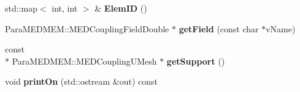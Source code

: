 \begin{DoxyCompactItemize}
\item 
\hypertarget{class_lib_mesh_function_a455f565d4bcedad79a3ece4bc38cb213}{std\-::map$<$ int, int $>$ \& {\bfseries Elem\-I\-D} ()}\label{class_lib_mesh_function_a455f565d4bcedad79a3ece4bc38cb213}

\item 
\hypertarget{class_lib_mesh_function_a89398c781ae98e1130281232cae85585}{Para\-M\-E\-D\-M\-E\-M\-::\-M\-E\-D\-Coupling\-Field\-Double $\ast$ {\bfseries get\-Field} (const char $\ast$v\-Name)}\label{class_lib_mesh_function_a89398c781ae98e1130281232cae85585}

\item 
\hypertarget{class_lib_mesh_function_acbf42955775e5024568eb53ee7d3f92f}{const \\*
Para\-M\-E\-D\-M\-E\-M\-::\-M\-E\-D\-Coupling\-U\-Mesh $\ast$ {\bfseries get\-Support} ()}\label{class_lib_mesh_function_acbf42955775e5024568eb53ee7d3f92f}

\item 
\hypertarget{class_lib_mesh_function_ab382d27c50b41b0cbe41a134b98fa74c}{void {\bfseries print\-On} (std\-::ostream \&out) const }\label{class_lib_mesh_function_ab382d27c50b41b0cbe41a134b98fa74c}

\end{DoxyCompactItemize}
